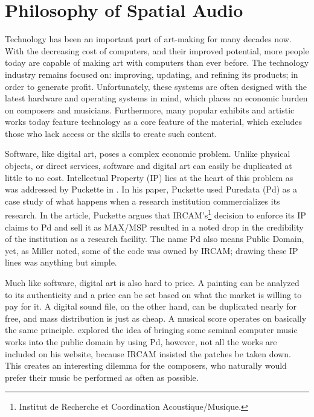 \section{Philosophy of Spatial Audio}


Technology has been an important part of art-making for many decades now. With the decreasing cost of computers, and their improved potential, more people today are capable of making art with computers than ever before. The technology industry remains focused on: improving, updating, and refining its products; in order to generate profit. Unfortunately, these systems are often designed with the latest hardware and operating systems in mind, which places an economic burden on composers and musicians. Furthermore, many popular exhibits and artistic works today feature technology as a core feature of the material, which excludes those who lack access or the skills to create such content.

Software, like digital art, poses a complex economic problem. Unlike physical objects, or direct services, software and digital art can easily be duplicated at little to no cost. Intellectual Property (IP) lies at the heart of this problem as was addressed by Puckette in \cite{puckette2004owns}. In his paper, Puckette used Puredata (Pd) as a case study of what happens when a research institution commercializes its research. In the article, Puckette argues that IRCAM's\footnote{Institut de Recherche et Coordination Acoustique/Musique.} decision to enforce its IP claims to Pd and sell it as MAX/MSP resulted in a noted drop in the credibility of the institution as a research facility. The name Pd also means Public Domain, yet, as Miller noted, some of the code was owned by IRCAM; drawing these IP lines was anything but simple.

Much like software, digital art is also hard to price. A painting can be analyzed to its authenticity and a price can be set based on what the market is willing to pay for it. A digital sound file, on the other hand, can be duplicated nearly for free, and mass distribution is just as cheap. A musical score operates on basically the same principle. \cite{puckette2001new} explored the idea of bringing some seminal computer music works into the public domain by using Pd, however, not all the works are included on his website, because IRCAM insisted the patches be taken down. This creates an interesting dilemma for the composers, who naturally would prefer their music be performed as often as possible.

